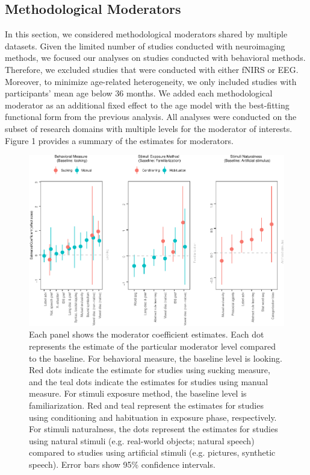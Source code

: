 \documentclass[10pt, letterpaper]{article}
\newenvironment{CodeChunk}{}{}
\begin{document}
\hypertarget{methodological-moderators}{%
\subsection{Methodological Moderators}\label{methodological-moderators}}

In this section, we considered methodological moderators shared by
multiple datasets. Given the limited number of studies conducted with
neuroimaging methods, we focused our analyses on studies conducted with
behavioral methods. Therefore, we excluded studies that were conducted
with either fNIRS or EEG. Moreover, to minimize age-related
heterogeneity, we only included studies with participants' mean age
below 36 months. We added each methodological moderator as an additional
fixed effect to the age model with the best-fitting functional form from
the previous analysis. All analyses were conducted on the subset of
research domains with multiple levels for the moderator of interests.
Figure 1 provides a summary of the estimates for moderators.

\begin{CodeChunk}
\begin{figure}[t!]

{\centering \includegraphics{figs/mod_plot-1} 

}

\caption[Each panel shows the moderator coefficient estimates]{Each panel shows the moderator coefficient estimates. Each dot represents the estimate of the particular moderator level compared to the baseline. For behavioral measure, the baseline level is looking. Red dots indicate the estimate for studies using sucking measure, and the teal dots indicate the estimates for studies using manual measure. For stimuli exposure method, the baseline level is familiarization. Red and teal represent the estimates for studies using conditioning and habituation in exposure phase, respectively. For stimuli naturalness, the dots represent the estimates for studies using natural stimuli (e.g. real-world objects; natural speech) compared to studies using artificial stimuli (e.g. pictures, synthetic speech). Error bars show 95\% confidence intervals.}\label{fig:mod_plot}
\end{figure}
\end{CodeChunk}
\end{document}
